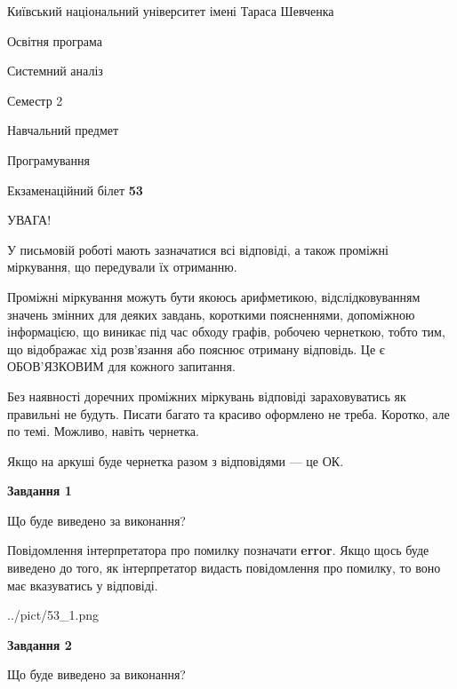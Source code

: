 \documentclass[12pt, ukrainian]{article}
\begin{document}
{{\begin {small}\par
{ \center  Київський національний університет імені Тараса Шевченка \par}
{\parbox {5 cm}{Освітня програма \hfill}{\parbox {7 cm}{Системний аналіз \hfill}}\parbox {6 cm}{\hfill Семестр 2}}\par
{\parbox {5 cm} {Навчальний предмет \hfill}\parbox {7 cm}{Програмування \hfill}\parbox {6cm}{\hfill}\par}\vspace{-7pt} \end{small}}{\center Екзаменаційний білет \No \textbf
{ 53 }\par}}
{
\begin {large}
УВАГА!

У письмовій роботі мають зазначатися всі відповіді, а також проміжні міркування, що передували їх отриманню.

Проміжні міркування можуть бути якоюсь арифметикою, відслідковуванням зна\-чень змінних для деяких завдань,
короткими поясненнями, допоміжною інформацією, що виникає під час обходу графів, робочею чернеткою,
тобто тим, що відображає хід розв’язання або пояснює отриману відповідь.
Це є ОБОВ’ЯЗКОВИМ для кожного запитання.

Без наявності доречних проміжних міркувань відповіді зараховуватись як правиль\-ні не будуть.
Писати багато та красиво оформлено не треба. Коротко, але по темі. Можли\-во, навіть чернетка.

Якщо на аркуші буде чернетка разом з відповідями --- це ОК.

\newpage

{\begin {center}\textbf{Завдання 1}\end {center}}\par
Що буде виведено за виконання?

Повідомлення інтерпретатора про помилку позначати \textbf{error}.
Якщо щось буде виведено до того, як інтерпретатор видасть повідомлення про помилку, 
то воно має вказуватись у відповіді. \par


\begin{center}
	{../pict/53_1.png}
\end{center}
\newpage

{\begin {center}\textbf{Завдання 2}\end {center}}\par
Що буде виведено за виконання?


\end{large}}
\end{document}
